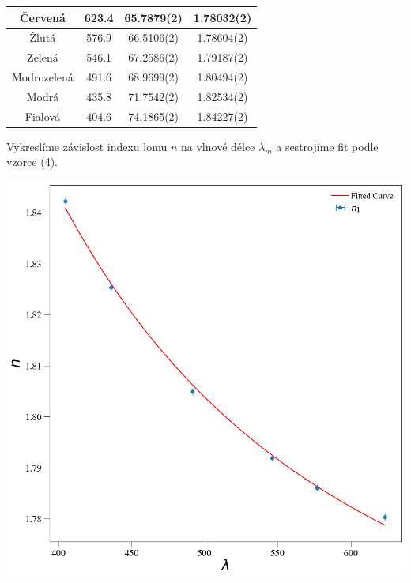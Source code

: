 \documentclass[a4paper,11pt]{article}
\begin{document}
\begin{minipage}[t]{0.5\textwidth}
\begin{tabular}{|c|c|c|c|}
                    \hline
                    Červená & 623.4 & 65.7879(2) & 1.78032(2)\\
                    \hline
                    Žlutá & 576.9 & 66.5106(2) & 1.78604(2)\\
                    \hline
                    Zelená & 546.1 & 67.2586(2) & 1.79187(2)\\
                    \hline
                    Modrozelená & 491.6 & 68.9699(2) & 1.80494(2)\\
                    \hline
                    Modrá & 435.8 & 71.7542(2) & 1.82534(2)\\
                    \hline
                    Fialová & 404.6 & 74.1865(2) & 1.84227(2)\\
                    \hline
                \end{tabular}
                \captionsetup{justification=centering, font=footnotesize}
                \vspace{10pt}
                \raggedright
                \par Vykreslíme závislost indexu lomu $n$ na vlnové délce $\lambda_m$ a sestrojíme fit podle vzorce (4). 
                \vspace{10pt}
                \par 
                \centering
                \includegraphics[scale=0.3]{index}

\end{minipage}
\end{document}
